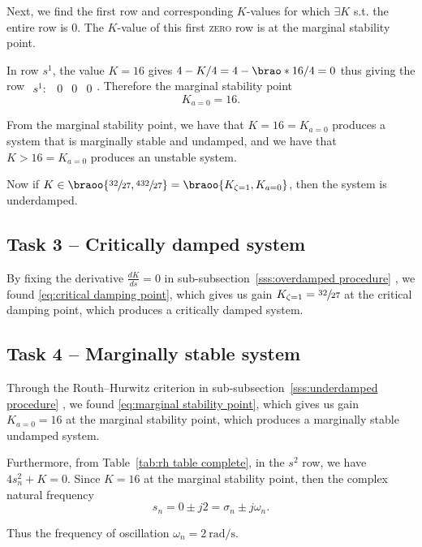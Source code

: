 \documentclass[12pt]{article}
\DeclarePairedDelimiter\brao()%
\begin{document}
Next, we find the first row and corresponding $K$-values for which $\exists K$ s.t. the entire row is $0$.
The $K$-value of this first \textsc{zero} row is at the marginal stability point.

In row $s^1$, the value $K = 16$ gives $4 - K/4 = 4 - \brao*{16}/4 = 0$ thus giving the row $\begin{matrix}s^1: & 0 & 0 & 0\end{matrix}$.
Therefore the marginal stability point
\begin{equation}\label{eq:marginal stability point}
    K_{a=0} = 16.
\end{equation}

From the marginal stability point, we have that $K = 16 = K_{a=0}$ produces a system that is marginally stable and undamped, and we have that $K > 16 = K_{a=0}$ produces an unstable system.

Now if $K \in \braoo{\sfrac{32}{27}, \sfrac{432}{27}} = \braoo{K_{\zeta=1}, K_{a=0}}$, then the system is underdamped.

\subsection{Task 3 -- Critically damped system}

By fixing the derivative $\frac{dK}{ds} = 0$ in sub-subsection~\ref{sss:overdamped procedure}%
, we found \eqref{eq:critical damping point},
which gives us gain $K_{\zeta=1} = \sfrac{32}{27}$
at the critical damping point, which produces a critically damped system.

\subsection{Task 4 -- Marginally stable system}

Through the Routh--Hurwitz criterion in sub-subsection~\ref{sss:underdamped procedure}%
, we found \eqref{eq:marginal stability point},
which gives us gain $K_{a=0} = 16$
at the marginal stability point, which produces a marginally stable undamped system.

Furthermore, from Table~\ref{tab:rh table complete}, in the $s^2$ row, we have $4s_n^2 + K = 0$. Since $K = 16$ at the marginal stability point, then the complex natural frequency
\begin{equation}
    s_n = 0 \pm j2 = \sigma_n \pm j\omega_n.
\end{equation}

Thus the frequency of oscillation $\omega_n = \SI{2}{\radian\per\second}$.
\end{document}
